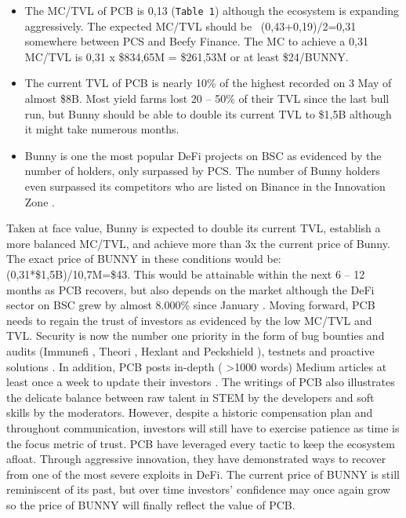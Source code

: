 \documentclass[12pt]{article}
\begin{document}
\begin{itemize}
\item The MC/TVL of PCB is 0,13 (\verb|Table 1|) although the ecosystem is expanding aggressively. The expected MC/TVL should be ~(0,43+0,19)/2=0,31 somewhere between PCS and Beefy Finance. The MC to achieve a 0,31 MC/TVL is 0,31 x \$834,65M = \$261,53M or at least \$24/BUNNY.

\item The current TVL of PCB is nearly 10\% of the highest recorded on 3 May of almost \$8B. Most yield farms lost 20 – 50\% of their TVL since the last bull run, but Bunny should be able to double its current TVL to \$1,5B although it might take numerous months.

\item Bunny is one the most popular DeFi projects on BSC as evidenced by the number of holders, only surpassed by PCS. The number of Bunny holders even surpassed its competitors who are listed on Binance in the Innovation Zone \cite{binance_listed}.
\end{itemize}

Taken at face value, Bunny is expected to double its current TVL, establish a more balanced MC/TVL, and achieve more than  3x the current price of Bunny. The exact price of BUNNY in these conditions would be:(0,31*\$1,5B)/10,7M=\$43. This would be attainable within the next 6 – 12 months as PCB recovers, but also depends on the market although the DeFi sector on BSC grew by almost 8.000\% since January \cite{bsc_debank}. Moving forward, PCB needs to regain the trust of investors as evidenced by the low MC/TVL and TVL. Security is now the number one priority in the form of bug bounties and audits (Immunefi \cite{bunny_immunefi}, Theori \cite{bunny_theori}, Hexlant \cite{bunny_hexlant_peckshield} and Peckshield \cite{bunny_hexlant_peckshield}), testnets \cite{qbt_testnet} and proactive solutions \cite{bsc_summit}. In addition, PCB posts in-depth ( \textgreater 1000 words) Medium articles at least once a week to update their investors \cite{bunny_medium}. The writings of PCB also illustrates the delicate balance between raw talent in STEM by the developers and soft skills by the moderators. However, despite a historic compensation plan and throughout communication, investors will still have to exercise patience as time is the focus metric of trust.
PCB have leveraged every tactic to keep the ecosystem afloat. Through aggressive innovation, they have demonstrated ways to recover from one of the most severe exploits in DeFi. The current price of BUNNY is still reminiscent of its past, but over time investors' confidence may once again grow so the price of BUNNY will finally reflect the value of PCB.
\end{document}
